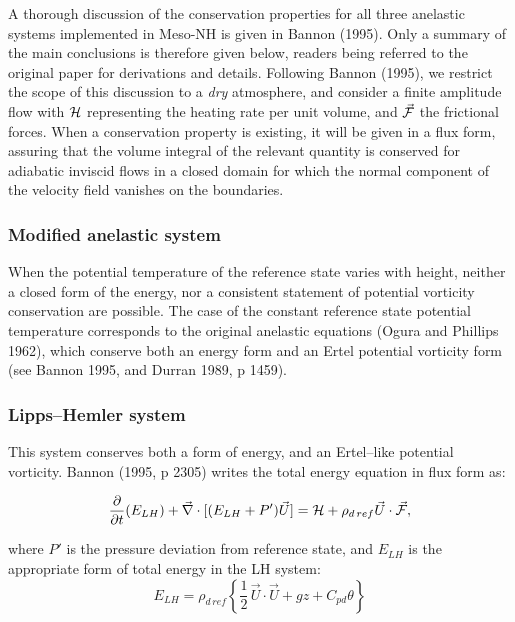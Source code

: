 A thorough discussion of the conservation properties for all three anelastic systems
implemented in Meso-NH is given in Bannon (1995). Only a summary of the main conclusions
is therefore given below, readers being referred to the original paper for
derivations and details. Following Bannon (1995), we restrict the scope of this discussion to a
{\em dry} atmosphere, and consider a finite amplitude  flow with $\cal H$ representing
the heating rate per unit volume, and $\vec{\cal F}$ the frictional forces. When a conservation
property is existing, it will be given in a flux form, assuring that the volume integral of the
relevant quantity is conserved for adiabatic inviscid flows in a closed domain for which the
normal component of the velocity field vanishes on the boundaries.

\subsubsection{Modified anelastic system}

When the potential temperature of the reference state varies with height, neither a closed form
of the energy, nor a consistent statement of potential vorticity conservation are possible.
The case of the constant reference state potential temperature corresponds to the original
anelastic  equations  (Ogura and Phillips 1962), which conserve both an energy form and
an Ertel potential vorticity form (see Bannon 1995, and Durran 1989, p 1459).

\subsubsection{Lipps--Hemler system}

This system conserves both a form of energy, and an Ertel--like potential vorticity.
Bannon (1995, p 2305) writes the total energy equation in flux form  as:

\begin{equation}
\dfrac{\partial}{\partial t}(E_{LH})
 + \vec{ \nabla} \cdot [(E_{LH} + P ') \vec{U}]
  = {\cal H} + \rho_{d\,ref} \vec{U} \cdot  \vec{\cal F},
\end{equation}

where $P '$ is the pressure deviation from reference state,
and $E_{LH}$ is the appropriate form of total energy in the LH system:
\begin{equation}
E_{LH} = \rho_{d\,ref} \left\{ { \frac{1}{2}\, \vec{U} \cdot \vec{U}}
         + g z  + C_{pd} \theta \right\}
\end{equation}

